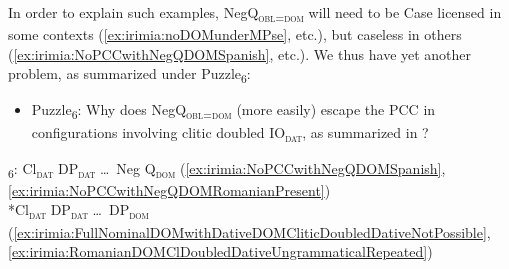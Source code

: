 \documentclass[output=paper,colorlinks,citecolor=brown,draft,draftmode]{langscibook}
\begin{document}
In order to explain such examples, NegQ\textsubscript{\textsc{obl=dom}} will need to be Case licensed in some contexts (\ref{ex:irimia:noDOMunderMPse}, etc.), but caseless in others (\ref{ex:irimia:NoPCCwithNegQDOMSpanish}, etc.). We thus have yet another problem, as summarized under Puzzle\textsubscript{6}:
\largerpage[2]

\begin{itemize}
\item {Puzzle\textsubscript{6}}: Why does NegQ\textsubscript{\textsc{obl=dom}} (more easily) escape the PCC in configurations involving clitic doubled IO\textsubscript{\textsc{dat}}, as summarized in ?
\end{itemize}

\textsubscript{6}: \Checkmark Cl\textsubscript{\textsc{dat}} DP\textsubscript{\textsc{dat}} \ldots\, Neg Q\textsubscript{\textsc{dom}} (\ref{ex:irimia:NoPCCwithNegQDOMSpanish}, \ref{ex:irimia:NoPCCwithNegQDOMRomanianPresent}) \\
\indent \hskip 1.5cm  *Cl\textsubscript{\textsc{dat}} DP\textsubscript{\textsc{dat}} \ldots\, DP\textsubscript{\textsc{dom}} (\ref{ex:irimia:FullNominalDOMwithDativeDOMCliticDoubledDativeNotPossible}, \ref{ex:irimia:RomanianDOMClDoubledDativeUngrammaticalRepeated})
\label{ex:irimia:Puzzle5}
\z
\end{document}
